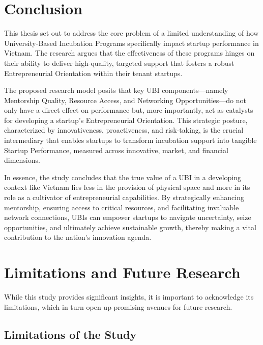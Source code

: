 \documentclass[../Main.tex]{subfiles}
\begin{document}
	\section{Conclusion}
	
	This thesis set out to address the core problem of a limited understanding of how University-Based Incubation Programs specifically impact startup performance in Vietnam. The research argues that the effectiveness of these programs hinges on their ability to deliver high-quality, targeted support that fosters a robust Entrepreneurial Orientation within their tenant startups.
	
	The proposed research model posits that key UBI components—namely Mentorship Quality, Resource Access, and Networking Opportunities—do not only have a direct effect on performance but, more importantly, act as catalysts for developing a startup's Entrepreneurial Orientation. This strategic posture, characterized by innovativeness, proactiveness, and risk-taking, is the crucial intermediary that enables startups to transform incubation support into tangible Startup Performance, measured across innovative, market, and financial dimensions.
	
	In essence, the study concludes that the true value of a UBI in a developing context like Vietnam lies less in the provision of physical space and more in its role as a cultivator of entrepreneurial capabilities. By strategically enhancing mentorship, ensuring access to critical resources, and facilitating invaluable network connections, UBIs can empower startups to navigate uncertainty, seize opportunities, and ultimately achieve sustainable growth, thereby making a vital contribution to the nation's innovation agenda.
	
	\section{Limitations and Future Research}
	
	While this study provides significant insights, it is important to acknowledge its limitations, which in turn open up promising avenues for future research.
	
	\subsection{Limitations of the Study}
	
\end{document}
